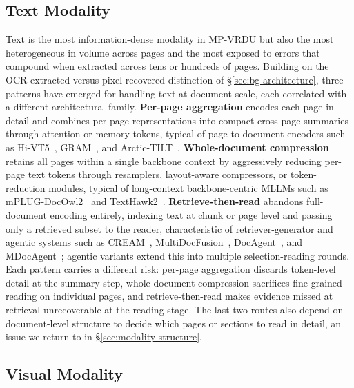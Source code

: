 \documentclass[11pt]{article}
\begin{document}
\subsection{Text Modality}
\label{sec:modality-text}

Text is the most information-dense modality in MP-VRDU but also the most heterogeneous in volume across pages and the most exposed to errors that compound when extracted across tens or hundreds of pages. Building on the OCR-extracted versus pixel-recovered distinction of \S\ref{sec:bg-architecture}, three patterns have emerged for handling text at document scale, each correlated with a different architectural family. \textbf{Per-page aggregation} encodes each page in detail and combines per-page representations into compact cross-page summaries through attention or memory tokens, typical of page-to-document encoders such as Hi-VT5~\cite{tito2023hierarchical}, GRAM~\cite{blau2024gram}, and Arctic-TILT~\cite{borchmann2025arctictilt}. \textbf{Whole-document compression} retains all pages within a single backbone context by aggressively reducing per-page text tokens through resamplers, layout-aware compressors, or token-reduction modules, typical of long-context backbone-centric MLLMs such as mPLUG-DocOwl2~\cite{hu2025mplugdocowl2} and TextHawk2~\cite{yu2024texthawk2}. \textbf{Retrieve-then-read} abandons full-document encoding entirely, indexing text at chunk or page level and passing only a retrieved subset to the reader, characteristic of retriever-generator and agentic systems such as CREAM~\cite{zhang2024cream}, MultiDocFusion~\cite{shin2025multidocfusion}, DocAgent~\cite{sun2025docagent}, and MDocAgent~\cite{han2025mdocagent}; agentic variants extend this into multiple selection-reading rounds. Each pattern carries a different risk: per-page aggregation discards token-level detail at the summary step, whole-document compression sacrifices fine-grained reading on individual pages, and retrieve-then-read makes evidence missed at retrieval unrecoverable at the reading stage. The last two routes also depend on document-level structure to decide which pages or sections to read in detail, an issue we return to in \S\ref{sec:modality-structure}.

\subsection{Visual Modality}
\label{sec:modality-visual}
\end{document}
